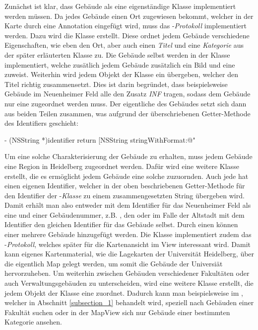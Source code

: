\documentclass{report}
\begin{document}
Zunächst ist klar, dass Gebäude als eine eigenständige Klasse implementiert werden müssen. Da jedes Gebäude einen Ort zugewiesen bekommt, welcher in der Karte durch eine Annotation eingefügt wird, muss das -\emph{Protokoll} implementiert werden. Dazu wird die Klasse  erstellt. Diese ordnet jedem Gebäude verschiedene Eigenschaften, wie eben den Ort, aber auch einen \emph{Titel} und eine \emph{Kategorie} aus der später erläuterten Klasse  zu. Die Gebäude selbst werden in der Klasse  implementiert, welche zusätlich jedem Gebäude zusätzlich ein Bild und eine  zuweist. Weiterhin wird jedem Objekt der Klasse ein  übergeben, welcher den Titel richtig zusammensetzt. Dies ist darin begründet, dass beispielsweise Gebäude im Neuenheimer Feld alle den Zusatz \emph{INF} tragen, sodass dem Gebäude nur eine  zugeordnet werden muss. Der eigentliche  des Gebäudes setzt sich dann aus beiden Teilen zusammen, was aufgrund der überschriebenen Getter-Methode des Identifiers geschieht:

\begin{objclst}
- (NSString *)identifier {
    return [NSString stringWithFormat:@"%
}
\end{objclst}

\noindent Um eine solche Charakterisierung der Gebäude zu erhalten, muss jedem Gebäude eine Region in Heidelberg zugeordnet werden. Dafür wird eine weitere Klasse  erstellt, die es ermöglicht jedem Gebäude eine solche  zuzuornden. Auch jede  hat einen eigenen Identifier, welcher in der oben beschriebenen Getter-Methode für den Identifier der -\emph{Klasse} zu einem zusammengesetzten String übergeben wird. Damit erhält man also entweder mit dem Identifier  für das Neuenheimer Feld als eine  und einer Gebäudenummer, z.B. , den   oder im Falle der Altstadt mit dem Identifier  den gleichen Identifier für das Gebäude selbst. Durch einen  können einer  mehrere Gebäude hinzugefügt werden. Die Klasse  implementiert zudem das -\emph{Protokoll}, welches später für die Kartenansicht im View interessant wird. Damit kann eigenes Kartenmaterial, wie die Lagekarten der Universität Heidelberg, über die eigentlich Map gelegt werden, um somit die Gebäude der Universiät hervorzuheben. Um weiterhin zwischen Gebäuden verschiedener Fakultäten oder auch Verwaltungsgebäuden zu unterscheiden, wird eine weitere Klasse  erstellt, die jedem Objekt der Klasse  eine  zuordnet. Dadurch kann man beispielsweise im , welcher in Abschnitt \ref{subsection_1} behandelt wird, speziell nach Gebäuden einer Fakultät suchen oder in der MapView sich nur Gebäude einer bestimmten Kategorie ansehen. 
\end{document}
